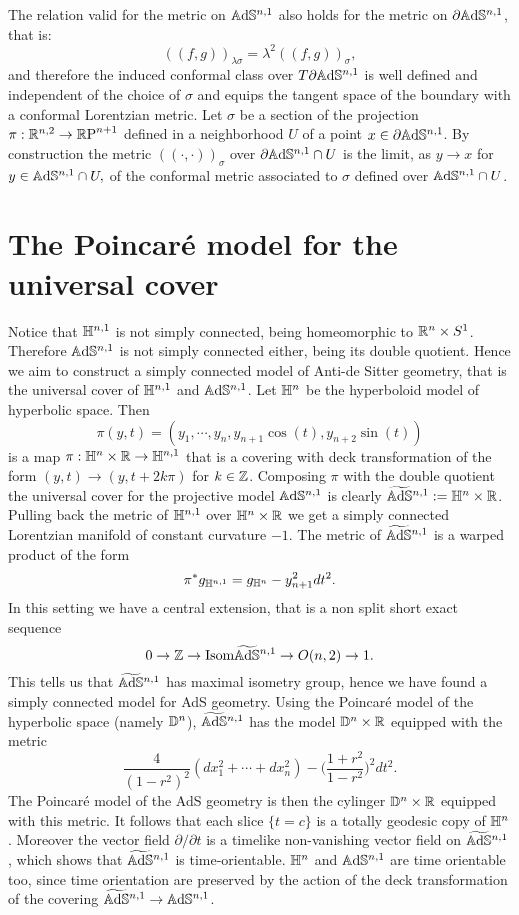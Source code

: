 The relation valid for the metric on $\mathbb{A}\mathrm{d}\mathbb{S}^{n,1}$ also holds for the metric on $\partial\mathbb{A}\mathrm{d}\mathbb{S}^{n,1}$, that is: 
\[
    ((f,g))_{\lambda\sigma}=\lambda^2((f,g))_{\sigma},
\] 
and therefore the induced conformal class over $T\partial\mathbb{A}\mathrm{d}\mathbb{S}^{n,1}$ is well defined and independent of the choice of $\sigma$ and equips the tangent space of the boundary with a conformal Lorentzian metric. 
Let $\sigma$ be a section of the projection $\pi:\mathbb{R}^{n,2}\to \mathbb{R}\text{P}^{n+1}$ defined in a neighborhood $U$ of a point $x\in\partial\mathbb{A}\mathrm{d}\mathbb{S}^{n,1}$. By construction the metric $((\cdot,\cdot))_\sigma$ over $\partial\mathbb{A}\mathrm{d}\mathbb{S}^{n,1}\cap U$ is the limit, as $y\to x$ for $y\in\mathbb{A}\mathrm{d}\mathbb{S}^{n,1}\cap U,$ of the conformal metric associated to $\sigma$ defined over $\mathbb{A}\mathrm{d}\mathbb{S}^{n,1}\cap U$.\\

\section{The Poincaré model for the universal cover}
Notice that $\mathbb{H}^{n,1}$ is not simply connected, being homeomorphic to $\mathbb{R}^n \times S^1$. Therefore $\mathbb{A}\mathrm{d}\mathbb{S}^{n,1}$ is not simply connected either, being its double quotient.
Hence we aim to construct a simply connected model of Anti-de Sitter geometry, that is the universal cover of $\mathbb{H}^{n,1}$ and $\mathbb{A}\mathrm{d}\mathbb{S}^{n,1}$.
Let $\mathbb{H}^n$ be the hyperboloid model of hyperbolic space. Then
\[
\pi(y,t) = (y_1 , \cdots , y_n, y_{n+1} \cos(t) , y_{n+2} \sin(t))
\]
is a map $\pi : \mathbb{H}^n \times \mathbb{R} \to \mathbb{H}^{n,1}$ that is a covering with deck transformation of the form $(y,t) \to (y, t+2k\pi)$ for $k \in \mathbb{Z}$. Composing $\pi$ with the double quotient the universal cover for the projective model $\mathbb{A}\mathrm{d}\mathbb{S}^{n,1}$ is clearly  $\widetilde{\mathbb{A}\mathrm{d}\mathbb{S}}{} ^{n,1} :=  \mathbb{H}^n \times \mathbb{R}$.\\
Pulling back the metric of $\mathbb{H}^{n,1}$ over $\mathbb{H}^n \times \mathbb{R}$ we get a simply connected Lorentzian manifold of constant curvature $-1$.
The metric of $\widetilde{\mathbb{A}\mathrm{d}\mathbb{S}}{}^{n,1}$ is a warped product of the form
\[
    \pi^*g_{\mathbb{H}^{n,1}}= g_{\mathbb{H}^n} - y^2_{n+1}dt^2.
\]
In this setting we have a central extension, that is a non split short exact sequence
\[
    0 \to \mathbb{Z} \to \text{Isom}\widetilde{\mathbb{A}\mathrm{d}\mathbb{S}}{}^{n,1} \to O(n,2) \to 1.
\]
This tells us that $\widetilde{\mathbb{A}\mathrm{d}\mathbb{S}}{}^{n,1}$ has maximal isometry group, hence we have found a simply connected model for AdS geometry.
Using the Poincaré model of the hyperbolic space (namely $\mathbb{D}^n$), $\widetilde{\mathbb{A}\mathrm{d}\mathbb{S}}{}^{n,1}$ has the model $\mathbb{D}^n \times \mathbb{R}$ equipped with the metric
\[
    \frac{4}{(1-r^2)^2} (dx_1^2 + \cdots + dx_n^2) - \Big( \frac{1+r^2}{1-r^2} \Big)^2 dt^2.
\]
The Poincaré model of the AdS geometry is then the cylinger $\mathbb{D}^n \times \mathbb{R}$ equipped with this metric.
It follows that each slice $\{ t=c \}$ is a totally geodesic copy of $\mathbb{H}^n$. Moreover the vector field $\partial / \partial t$ is a timelike non-vanishing vector field on $\widetilde{\mathbb{A}\mathrm{d}\mathbb{S}}{}^{n,1}$, which shows that $\widetilde{\mathbb{A}\mathrm{d}\mathbb{S}}{}^{n,1}$ is time-orientable. $\mathbb{H}^n$ and $\mathbb{A}\mathrm{d}\mathbb{S}^{n,1}$ are time orientable too, since time orientation are preserved by the action of the deck transformation of the covering $\widetilde{\mathbb{A}\mathrm{d}\mathbb{S}}{}^{n,1} \to \mathbb{A}\mathrm{d}\mathbb{S}^{n,1}$.

